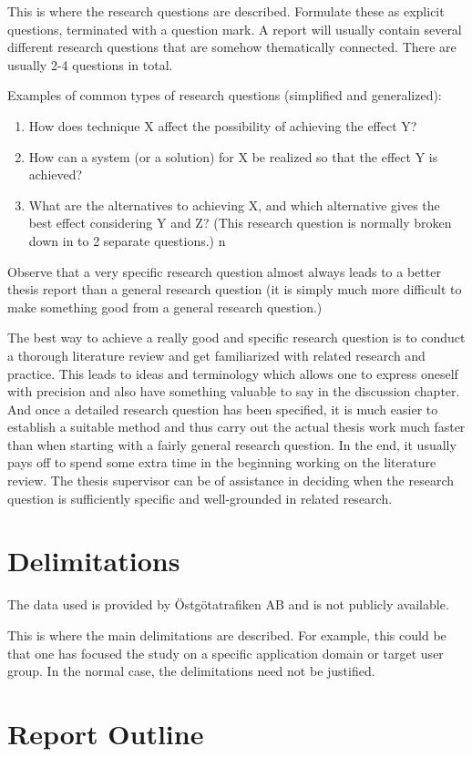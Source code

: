 This is where the research questions are described.
Formulate these as explicit questions, terminated with a
question mark. A report will usually contain several different
research questions that are somehow thematically connected.
There are usually 2-4 questions in total.

Examples of common types of research questions (simplified
and generalized):

\begin{enumerate}
\item How does technique X affect the possibility of achieving the
  effect Y?

\item How can a system (or a solution) for X be realized so
  that the effect Y is achieved?

\item What are the alternatives to
  achieving X, and which alternative gives the best effect considering
  Y and Z? (This research question is normally broken down in to 2
  separate questions.)
n
\end{enumerate}

Observe that a very specific research question almost always
leads to a better thesis report than a general research question
(it is simply much more difficult to make something good
from a general research question.)

The best way to achieve a really good and specific research
question is to conduct a thorough literature review and get
familiarized with related research and practice. This leads to
ideas and terminology which allows one to express oneself
with precision and also have something valuable to say in the
discussion chapter. And once a detailed research question
has been specified, it is much easier to establish a suitable
method and thus carry out the actual thesis work much faster
than when starting with a fairly general research question. In
the end, it usually pays off to spend some extra time in the
beginning working on the literature review. The thesis
supervisor can be of assistance in deciding when the research
question is sufficiently specific and well-grounded in related
research.

\section{Delimitations}
\label{sec:delimitations}
The data used is provided by Östgötatrafiken AB and is not publicly
available. 

This is where the main delimitations are described. For
example, this could be that one has focused the study on a
specific application domain or target user group. In the
normal case, the delimitations need not be justified.

\section{Report Outline}
